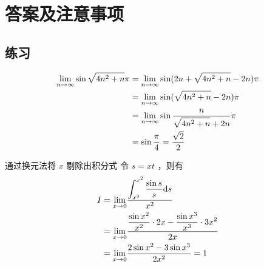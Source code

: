 \newpage
\chapter{答案及注意事项}
\section{练习}

\begin{Answer}
    \begin{equation*}
        \begin{aligned}
            \displaystyle {\displaystyle\lim_{n\rightarrow \infty}}\sin\sqrt{4n^2+n}\pi &=
            {\displaystyle\lim_{n\rightarrow \infty}}\sin(2n+\sqrt{4n^2+n}-2n)\pi \\
            &= {\displaystyle\lim_{n\rightarrow \infty}}\sin(\sqrt{4n^2+n}-2n)\pi \\
            &= {\displaystyle\lim_{n\rightarrow \infty}}\sin\displaystyle\frac{n}{\displaystyle\sqrt{4n^2+n}+2n}\pi \\
            &= \sin \frac{\pi}{4} = \frac{\sqrt 2}{2}
        \end{aligned}
    \end{equation*}
\end{Answer}

\begin{answer}[660T9]{通过换元法将 $ x $ 剔除出积分式}
    令 $ s = xt $ ，则有
    \begin{equation*}
        \begin{aligned}
            I&={\displaystyle\lim_{x\rightarrow 0}}
            \dfrac{\displaystyle \int_{x^3}^{x^2}\dfrac{\sin s}{s}\mathrm{d}s}{x^2}\\&=
            {\displaystyle\lim_{x\rightarrow 0}} \dfrac{\displaystyle \dfrac{\sin x^2}{x^2}\cdot 2x - 
            \dfrac{\sin x^3}{x^3}\cdot 3x^2}{2x} \\&= {\displaystyle\lim_{x\rightarrow 0}}
            \dfrac{2\sin x^2 - 3\sin x^3}{2x^2} = 1
        \end{aligned}
    \end{equation*}
\end{answer}

